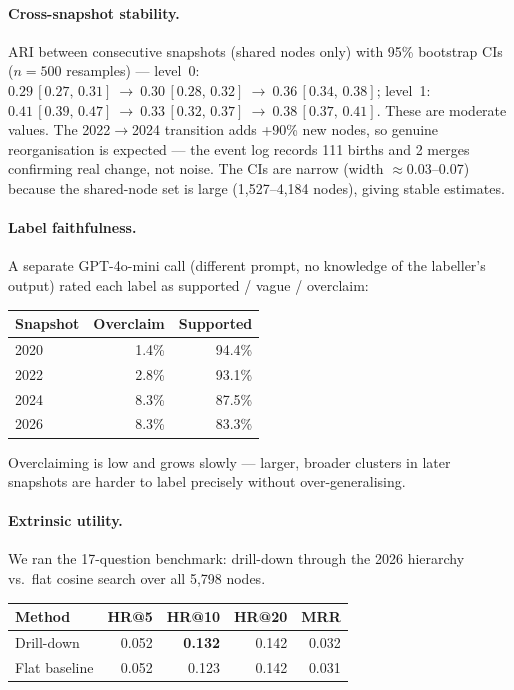 \documentclass[10pt]{article}
\begin{document}
\paragraph{Cross-snapshot stability.}
ARI between consecutive snapshots (shared nodes only) with 95\% bootstrap CIs
($n=500$ resamples) —
level~0: $0.29\,[0.27,\,0.31]\ \to\ 0.30\,[0.28,\,0.32]\ \to\ 0.36\,[0.34,\,0.38]$;
level~1: $0.41\,[0.39,\,0.47]\ \to\ 0.33\,[0.32,\,0.37]\ \to\ 0.38\,[0.37,\,0.41]$.
These are moderate values.
The 2022$\to$2024 transition adds +90\% new nodes, so genuine reorganisation is
expected — the event log records 111 births and 2 merges confirming real change,
not noise.
The CIs are narrow (width $\approx$0.03--0.07) because the shared-node set is large
(1,527--4,184 nodes), giving stable estimates.

\paragraph{Label faithfulness.}
A separate GPT-4o-mini call (different prompt, no knowledge of the labeller's
output) rated each label as supported / vague / overclaim:

\begin{center}\small
\begin{tabular}{lrr}
\toprule
Snapshot & Overclaim & Supported \\
\midrule
2020 & 1.4\% & 94.4\% \\
2022 & 2.8\% & 93.1\% \\
2024 & 8.3\% & 87.5\% \\
2026 & 8.3\% & 83.3\% \\
\bottomrule
\end{tabular}
\end{center}

Overclaiming is low and grows slowly — larger, broader clusters in later snapshots
are harder to label precisely without over-generalising.

\paragraph{Extrinsic utility.}
We ran the 17-question benchmark: drill-down through the 2026 hierarchy vs.\ flat
cosine search over all 5,798 nodes.

\begin{center}\small
\begin{tabular}{lrrrr}
\toprule
Method & HR@5 & HR@10 & HR@20 & MRR \\
\midrule
Drill-down & 0.052 & \textbf{0.132} & 0.142 & 0.032 \\
Flat baseline & 0.052 & 0.123 & 0.142 & 0.031 \\
\bottomrule
\end{tabular}
\end{center}
\end{document}
